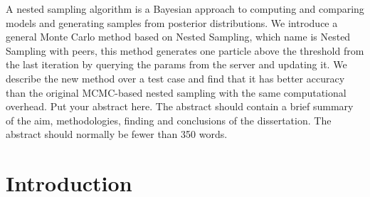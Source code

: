 \documentclass[11pt]{book}
\begin{document}
A nested sampling algorithm is a Bayesian approach to computing and comparing models and generating samples from posterior distributions. We introduce a general Monte Carlo method based on Nested Sampling, which name is Nested Sampling with peers, this method generates one particle above the threshold from the last iteration by querying the params from the server and updating it. We describe the new method over a test case and find that it has better accuracy than the original MCMC-based nested sampling with the same computational overhead.
 Put your abstract  here.  
 The abstract should contain a brief summary of the aim, methodologies, 
finding and conclusions of the dissertation.  The abstract should normally be fewer than 350 words.





\setcounter{secnumdepth}{3} %
\setcounter{tocdepth}{3}    %
\tableofcontents            %



	
\chapter{Introduction}%
\end{document}
